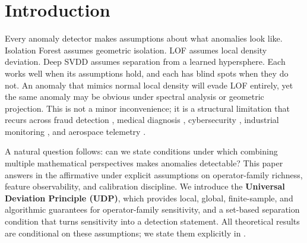 \documentclass{article}
\begin{document}
\begin{abstract}
Beyond the 5~base operators, we extend the framework to 14~composable spectrum operators across five mathematical families. A correlation audit across all 91~operator pairs reveals only one redundant pair (Wavelet$\leftrightarrow$Phase, $\rho{=}0.92$), validating the multi-spectrum thesis. We introduce \textbf{top-$k$ coverage} as a complementary metric to AUC. UDL-Hybrid with auto-selected projection strategy achieves mean AUC $0.972$ and 91\% mean coverage across five benchmarks, \textbf{exceeding all established baselines}. We validate the framework on three \textbf{real-world sensitive-sector datasets}: 25~G-SIB banks (FDIC + World~Bank) under a strictly prospective protocol with no hindsight (z-score alarm 6~quarters before Lehman Brothers, FAR~$= 1.6\%$), U.S.\ economy via FRED macro indicators (AUC~$= 0.9999$, FAR~$= 0.1\%$), and ERCOT Texas grid failure detection (AUC~$= 0.9940$, 37-hour lead time). All three domains achieve FCA-compliant false-alarm rates ($< 5\%$). Code is available at \url{https://github.com/segetii/fintech}.
\end{abstract}

\section{Introduction}
\label{sec:introduction}

Every anomaly detector makes assumptions about what anomalies look like. Isolation Forest \citep{liu2008isolation} assumes geometric isolation. LOF \citep{breunig2000lof} assumes local density deviation. Deep SVDD \citep{ruff2018deep} assumes separation from a learned hypersphere. Each works well when its assumptions hold, and each has blind spots when they do not. An anomaly that mimics normal local density will evade LOF entirely, yet the same anomaly may be obvious under spectral analysis or geometric projection. This is not a minor inconvenience; it is a structural limitation that recurs across fraud detection \citep{ahmed2016survey}, medical diagnosis \citep{fernando2021deep}, cybersecurity \citep{chandola2009anomaly}, industrial monitoring \citep{pang2021deep}, and aerospace telemetry \citep{hundman2018detecting}.

A natural question follows: can we state conditions under which combining multiple mathematical perspectives makes anomalies detectable? This paper answers in the affirmative under explicit assumptions on operator-family richness, feature observability, and calibration discipline. We introduce the \textbf{Universal Deviation Principle (UDP)}, which provides local, global, finite-sample, and algorithmic guarantees for operator-family sensitivity, and a set-based separation condition that turns sensitivity into a detection statement. All theoretical results are conditional on these assumptions; we state them explicitly in .
\end{document}
